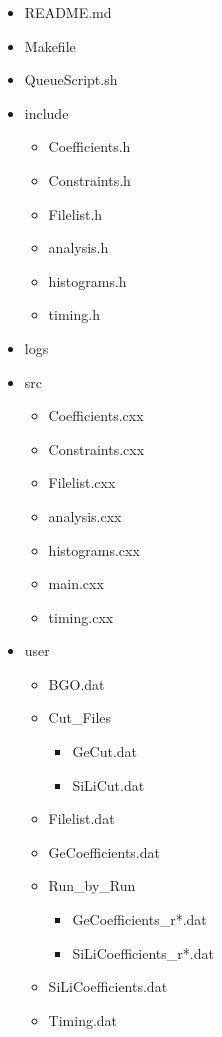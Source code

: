 \begin{itemize}[noitemsep, nolistsep]
    \item README.md
    \item Makefile
    \item QueueScript.sh
    \item include
    \vspace{-5mm}\begin{itemize}[noitemsep, nolistsep, topsep=0pt, label=\textbullet]
        \item Coefficients.h
        \item Constraints.h
        \item Filelist.h
        \item analysis.h
        \item histograms.h
        \item timing.h
    \end{itemize}
    \item logs
    \item src
    \vspace{-5mm}\begin{itemize}[noitemsep, nolistsep, topsep=0pt, label=\textbullet]
        \item Coefficients.cxx
        \item Constraints.cxx
        \item Filelist.cxx
        \item analysis.cxx
        \item histograms.cxx
        \item main.cxx
        \item timing.cxx
    \end{itemize}
    \item user
    \vspace{-5mm}\begin{itemize}[noitemsep, nolistsep, topsep=0pt, label=\textbullet]
        \item BGO.dat
        \item Cut\_Files
        \vspace{-5mm}\begin{itemize}[noitemsep, nolistsep, topsep=0pt, label=\textbullet]
            \item GeCut.dat
            \item SiLiCut.dat
        \end{itemize}
        \item Filelist.dat
        \item GeCoefficients.dat
        \item Run\_by\_Run
        \vspace{-5mm}\begin{itemize}[noitemsep, nolistsep, topsep=0pt, label=\textbullet]
            \item GeCoefficients\_r*.dat
            \item SiLiCoefficients\_r*.dat
        \end{itemize}
        \item SiLiCoefficients.dat
        \item Timing.dat
    \end{itemize}
\end{itemize}

